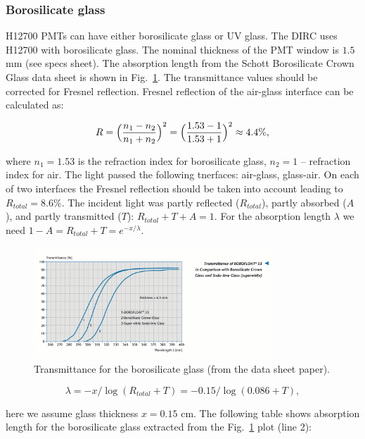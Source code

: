 \subsubsection*{Borosilicate glass}

H12700 PMTs can have either borosilicate glass or UV glass. The \gluex DIRC uses H12700 with borosilicate glass. The nominal thickness of the PMT window is $1.5$ mm (see specs sheet). The absorption length from the Schott Borosilicate Crown Glass data sheet is shown in Fig.~\ref{pic:gla}. The transmittance values should be corrected for Fresnel reflection. Fresnel reflection of the air-glass interface can be calculated as:

\begin{equation}
R = \Bigl( \frac{n_1 - n_2}{n_1 + n_2} \Bigr)^{2} = \Bigl( \frac{1.53 - 1}{1.53 + 1} \Bigr) ^{2} \approx 4.4\%,
\label{eq:fre}
\end{equation}

\noindent where $n_1 = 1.53$ is the refraction index for borosilicate glass, $n_2 = 1$ -- refraction index for air. The light passed the following tnerfaces: air-glass, glass-air. On each of two interfaces the Fresnel reflection should be taken into account leading to $R_{total} = 8.6\%$. The incident light was partly reflected ($R_{total}$), partly absorbed ($A$), and partly transmitted ($T$): $ R_{total} + T + A = 1$. For the absorption length $\lambda$ we need $1 - A = R_{total} + T = e^{-x/\lambda}$. 

\begin{figure}[htb]
\centering
\includegraphics[angle=0,width=0.8\textwidth]{pics/glass.png}
\caption{\label{pic:gla}
Transmittance for the borosilicate glass (from the data sheet paper).
}
\end{figure}

\begin{equation}
\lambda = -x/\log(R_{total}+T) = -0.15/\log(0.086+T),
\label{eq:lam}
\end{equation}

\noindent here we assume glass thickness $x = 0.15$ cm. The following table shows absorption length for the borosilicate glass extracted from the Fig.~\ref{pic:gla} plot (line 2):

